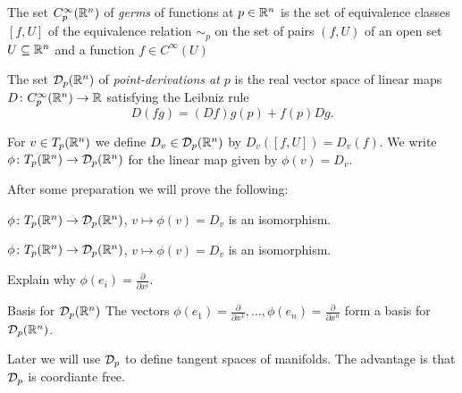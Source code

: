 \begin{frame}
  \begin{definition}[Germs]
    The set $C^{\infty}_p(\mathbb R^n)$ of {\em germs} of functions at $p \in \mathbb R^n$ is
    the set of equivalence classes $[f, U]$ of the equivalence relation $\sim_p$ on
    the set of pairs $(f, U)$ of an open set $U \subseteq \mathbb R^n$ and a function
    $f \in C^{\infty}(U)$
  \end{definition}
  \begin{definition}
    The set ${\mathcal D}_p(\mathbb R^n)$ of {\em point-derivations at $p$} is the real 
    vector space of 
    linear maps $D \colon C^{\infty}_p(\mathbb R^n) \to \mathbb R$ satisfying the Leibniz rule
    \begin{displaymath}
      D(fg) = (Df)g(p) + f(p)Dg.
    \end{displaymath}
  \end{definition}
  \begin{definition}
    For $v \in T_p(\mathbb R^n)$ we define $D_v \in {\mathcal D}_p(\mathbb R^n)$ by
    $D_v([f, U]) = D_v(f)$.
    We write $\phi \colon T_p(\mathbb R^n) \to {\mathcal D}_p(\mathbb R^n)$ for the linear map
    given by $\phi(v) = D_v$.
  \end{definition}
  After some preparation we will prove the following:
  \begin{thm}
    $\phi \colon T_p(\mathbb R^n) \to {\mathcal D}_p(\mathbb R^n)$, $v \mapsto \phi(v) = D_v$ is an isomorphism.
  \end{thm}
\end{frame}

\begin{frame}
  \begin{thm}
    $\phi \colon T_p(\mathbb R^n) \to {\mathcal D}_p(\mathbb R^n)$, $v \mapsto \phi(v) = D_v$ is an isomorphism.
  \end{thm}
  \begin{exercise}
    Explain why $\phi(e_i) = \frac{\partial}{\partial x^i}$.
  \end{exercise}
  \begin{block}
    {Basis for ${\mathcal D}_p(\mathbb R^n)$}
    The vectors 
    $\phi(e_1) = \frac{\partial}{\partial x^1}, \dots,
    \phi(e_n) = \frac{\partial}{\partial x^n}$ form a basis 
    for ${\mathcal D}_p(\mathbb R^n)$.
  \end{block}
  \begin{remark}
    Later we will use ${\mathcal D}_p$ to define tangent spaces of manifolds.
    The advantage is that ${\mathcal D}_p$ is coordiante free.
  \end{remark}
\end{frame}

